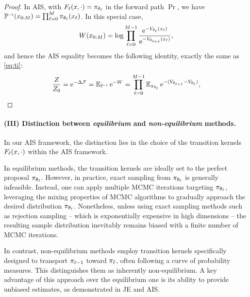 \begin{proof}
In AIS, with $F_\ell(x,\cdot)=\pi_{\theta_\ell}$ in the forward path $\Pr$, we have $\mathbb{P}^\to(x_{0:M})=\prod_{\ell=0}^{M}\pi_{\theta_\ell}(x_\ell)$. In this special case, 
$$W(x_{0:M})=\log\prod_{\ell=0}^{M-1}\frac{\mathrm{e}^{-V_{\theta_\ell}(x_\ell)}}{\mathrm{e}^{-V_{\theta_{\ell+1}}(x_\ell)}},$$
and hence the AIS equality becomes the following identity, exactly the same as \cref{eq:ti}:
\begin{equation}
    \frac{Z}{Z_0}=\mathrm{e}^{-\Delta\mathcal{F}}=\operatorname{\mathbb{E}}_{\mathbb{P}^\to}{\mathrm{e}^{-W}}=\prod_{\ell=0}^{M-1}\operatorname{\mathbb{E}}_{\pi_{\theta_\ell}}\mathrm{e}^{-(V_{\theta_{\ell+1}}-V_{\theta_\ell})},    \label{eq:ais_fl_pil}
\end{equation}
\end{proof}

\paragraph{(III) Distinction between \textit{equilibrium} and \textit{non-equilibrium} methods.} In our AIS framework, the distinction lies in the choice of the transition kernels $F_\ell(x,\cdot)$ within the AIS framework. 

In equilibrium methods, the transition kernels are ideally set to the perfect proposal $\pi_{\theta_\ell}$. However, in practice, exact sampling from $\pi_{\theta_\ell}$ is generally infeasible. Instead, one can apply multiple MCMC iterations targeting $\pi_{\theta_\ell}$, leveraging the mixing properties of MCMC algorithms to gradually approach the desired distribution $\pi_{\theta_\ell}$. Nonetheless, unless using exact sampling methods such as rejection sampling -- which is exponentially expensive in high dimensions -- the resulting sample distribution inevitably remains biased with a finite number of MCMC iterations. 

In contrast, non-equilibrium methods employ transition kernels specifically designed to transport $\pi_{\ell-1}$ toward $\pi_{\ell}$, often following a curve of probability measures. This distinguishes them as inherently non-equilibrium. A key advantage of this approach over the equilibrium one is its ability to provide unbiased estimates, as demonstrated in JE and AIS.